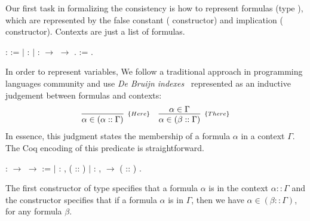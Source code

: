 Our first task in formalizing the consistency is how to represent formulas (type \coqdocvar{$\alpha$}), which
are represented by the false constant ( constructor) and implication ( constructor).
Contexts are just a list of formulas.
\begin{coqdoccode}
\coqdocemptyline
\coqdocnoindent
{} \coqdocvar{$\alpha$} :  :=\coqdoceol
\coqdocnoindent
\ensuremath{|}  : \coqdocvar{$\alpha$}\coqdoceol
\coqdocnoindent
\ensuremath{|}  : \coqdocvar{$\alpha$} \ensuremath{\rightarrow} \coqdocvar{$\alpha$} \ensuremath{\rightarrow} \coqdocvar{$\alpha$}.\coqdoceol
\coqdocemptyline
\coqdocnoindent
{} \coqdocvar{$\Gamma$} :=  \coqdocvar{$\alpha$}.\coqdoceol
\coqdocemptyline
\end{coqdoccode}
In order to represent variables, We follow a traditional approach in programming languages community
and use \emph{De Bruijn indexes}~\cite{DeBruijn71} represented as an inductive judgement between
formulas and contexts:
\[
\begin{array}{cc}
\infer[_{\{Here\}}]{\alpha \in (\alpha :: \Gamma)}{} &
\infer[_{\{There\}}]{\alpha \in (\beta :: \Gamma)}{\alpha \in \Gamma}
\end{array}
\]
In essence, this judgment states the membership of a formula $\alpha$ in a context $\Gamma$. 
The Coq encoding of this predicate is straightforward.
 \begin{coqdoccode}
\coqdocemptyline
\coqdocnoindent
{}  : \coqdocvar{$\Gamma$} \ensuremath{\rightarrow} \coqdocvar{$\alpha$} \ensuremath{\rightarrow}  :=\coqdoceol
\coqdocnoindent
\ensuremath{|}  : \coqdockw{\ensuremath{\forall}}  ,  ( :: ) \coqdoceol
\coqdocnoindent
\ensuremath{|}  : \coqdockw{\ensuremath{\forall}}   ,    \ensuremath{\rightarrow}  ( :: ) .\coqdoceol
\coqdocemptyline
\end{coqdoccode}
The first constructor of type  specifies that a formula $\alpha$ is in the context $\alpha :: \Gamma$ and
the constructor  specifies that if a formula $\alpha$ is in $\Gamma$, then we have
 $\alpha \in (\beta :: \Gamma)$, for any formula $\beta$.


